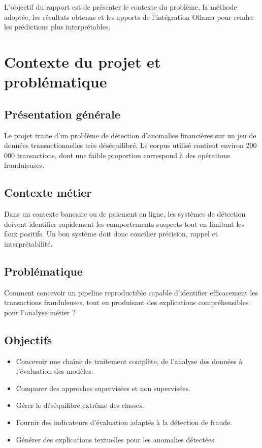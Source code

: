 \documentclass[12pt,a4paper,twoside]{report}
\begin{document}
L'objectif du rapport est de présenter le contexte du problème, la méthode adoptée, les résultats obtenus et les apports de l'intégration Ollama pour rendre les prédictions plus interprétables.

\chapter{Contexte du projet et problématique}

\section{Présentation générale}
Le projet traite d'un problème de détection d'anomalies financières sur un jeu de données transactionnelles très déséquilibré. Le corpus utilisé contient environ 200 000 transactions, dont une faible proportion correspond à des opérations frauduleuses.

\section{Contexte métier}
Dans un contexte bancaire ou de paiement en ligne, les systèmes de détection doivent identifier rapidement les comportements suspects tout en limitant les faux positifs. Un bon système doit donc concilier précision, rappel et interprétabilité.

\section{Problématique}
Comment concevoir un pipeline reproductible capable d'identifier efficacement les transactions frauduleuses, tout en produisant des explications compréhensibles pour l'analyse métier ?

\section{Objectifs}
\begin{itemize}
  \item Concevoir une chaîne de traitement complète, de l'analyse des données à l'évaluation des modèles.
  \item Comparer des approches supervisées et non supervisées.
  \item Gérer le déséquilibre extrême des classes.
  \item Fournir des indicateurs d'évaluation adaptés à la détection de fraude.
  \item Générer des explications textuelles pour les anomalies détectées.
\end{itemize}
\end{document}
